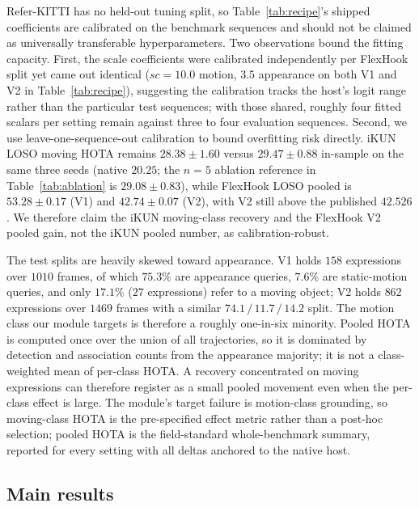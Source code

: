 \documentclass[sigconf,anonymous,nonacm]{acmart}
\begin{document}
Refer-KITTI has no held-out tuning split, so Table~\ref{tab:recipe}'s shipped coefficients are calibrated on the benchmark sequences and should not be claimed as universally transferable hyperparameters. Two observations bound the fitting capacity. First, the scale coefficients were calibrated independently per FlexHook split yet came out identical ($\mathit{sc}{=}10.0$ motion, $3.5$ appearance on both V1 and V2 in Table~\ref{tab:recipe}), suggesting the calibration tracks the host's logit range rather than the particular test sequences; with those shared, roughly four fitted scalars per setting remain against three to four evaluation sequences. Second, we use leave-one-sequence-out calibration to bound overfitting risk directly. iKUN LOSO moving HOTA remains $28.38 \pm 1.60$ versus $29.47 \pm 0.88$ in-sample on the same three seeds (native $20.25$; the $n{=}5$ ablation reference in Table~\ref{tab:ablation} is $29.08 \pm 0.83$), while FlexHook LOSO pooled is $53.28 \pm 0.17$ (V1) and $42.74 \pm 0.07$ (V2), with V2 still above the published $42.526$. We therefore claim the iKUN moving-class recovery and the FlexHook V2 pooled gain, not the iKUN pooled number, as calibration-robust.

The test splits are heavily skewed toward appearance. V1 holds $158$ expressions over $1010$ frames, of which $75.3\%$ are appearance queries, $7.6\%$ are static-motion queries, and only $17.1\%$ ($27$ expressions) refer to a moving object; V2 holds $862$ expressions over $1469$ frames with a similar $74.1\,/\,11.7\,/\,14.2$ split. The motion class our module targets is therefore a roughly one-in-six minority. Pooled HOTA is computed once over the union of all trajectories, so it is dominated by detection and association counts from the appearance majority; it is not a class-weighted mean of per-class HOTA. A recovery concentrated on moving expressions can therefore register as a small pooled movement even when the per-class effect is large. The module's target failure is motion-class grounding, so moving-class HOTA is the pre-specified effect metric rather than a post-hoc selection; pooled HOTA is the field-standard whole-benchmark summary, reported for every setting with all deltas anchored to the native host.

\subsection{Main results}
\label{sec:main}
\end{document}
